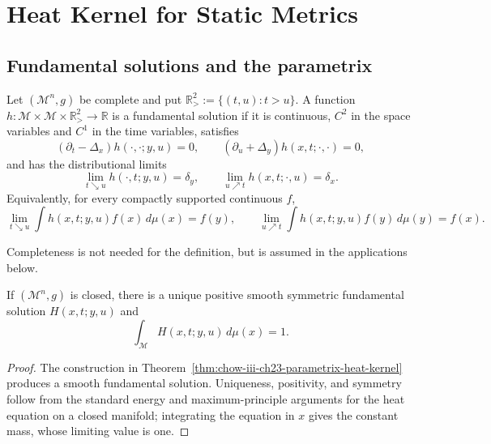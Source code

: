 \chapter[23]{Heat Kernel for Static Metrics}
\label{chow-iii-ch23-heat-kernel-static-metrics}

\section{Fundamental solutions and the parametrix}

\begin{definition}
\label{def:chow-iii-ch23-fundamental-solution}

Let $(\mathcal M^n,g)$ be complete and put
\(\mathbb R^2_>:=\{(t,u):t>u\}\).  A function
\(h:\mathcal M\times\mathcal M\times\mathbb R^2_>\to\mathbb R\) is a
fundamental solution if it is continuous, $C^2$ in the space variables and
$C^1$ in the time variables, satisfies
\[
(\partial_t-\Delta_x)h(\cdot,\cdot;y,u)=0,
\qquad (\partial_u+\Delta_y)h(x,t;\cdot,\cdot)=0,
\]
and has the distributional limits
\[
\lim_{t\searrow u}h(\cdot,t;y,u)=\delta_y,
\qquad \lim_{u\nearrow t}h(x,t;\cdot,u)=\delta_x.
\]
Equivalently, for every compactly supported continuous $f$,
\[
\lim_{t\searrow u}\int h(x,t;y,u)f(x)\,d\mu(x)=f(y),\qquad
\lim_{u\nearrow t}\int h(x,t;y,u)f(y)\,d\mu(y)=f(x).
\]
\end{definition}

\begin{remark}[Completeness]
\label{rem:chow-iii-ch23-completeness}

Completeness is not needed for the definition, but is assumed in the
applications below.
\end{remark}

\begin{theorem}
\label{thm:chow-iii-ch23-closed-heat-kernel}

If $(\mathcal M^n,g)$ is closed, there is a unique positive smooth symmetric
fundamental solution $H(x,t;y,u)$ and
\[
\int_{\mathcal M}H(x,t;y,u)\,d\mu(x)=1.
\]
\end{theorem}
\begin{proof}
\sketch The construction in Theorem~\ref{thm:chow-iii-ch23-parametrix-heat-kernel}
produces a smooth fundamental solution.  Uniqueness, positivity, and symmetry
follow from the standard energy and maximum-principle arguments for the heat
equation on a closed manifold; integrating the equation in $x$ gives the
constant mass, whose limiting value is one.
\end{proof}

